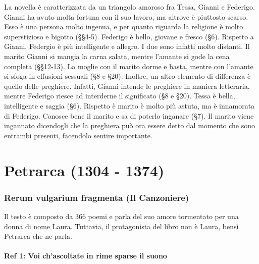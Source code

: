 \documentclass[a4paper]{article}
\begin{document}
La novella è caratterizzata da un triangolo amoroso fra Tessa, Gianni e Federigo.
Gianni ha avuto molta fortuna con il suo lavoro, ma altrove è piuttosto scarso.
Esso è una persona molto ingenua, e per quanto riguarda la religione è molto
superstizioso e bigotto (§§4-5).
Federigo è bello, giovane e fresco (§6).
Rispetto a Gianni, Federgio è più intelligente e allegro.
I due sono infatti molto distanti.
Il marito Gianni si mangia la carna salata, mentre l'amante si gode la cena completa (§§12-13).
La moglie con il marito dorme e basta, mentre con l'amante si sfoga in effusioni sessuali (§8 e §20).
Inoltre, un altro elemento di differenza è quello delle preghiere. Infatti, Gianni intende le preghiere in maniera letteraria,
mentre Federigo riesce ad interderne il significato (§8 e §20).
%
Tessa è bella, intelligente e saggia (§6). Rispetto è marito è molto più astuta, ma è innamorata di Federigo.
Conosce bene il marito e sa di poterlo inganare (§7).
Il marito viene ingannato dicendogli che la preghiera può ora essere detto dal momento che sono
entrambi presenti, facendolo sentire importante.



\pagebreak

\part{Petrarca (1304 - 1374)}



\section{Rerum vulgarium fragmenta (Il Canzoniere)}

Il testo è composto da 366 poemi e parla del suo amore tormentato per una donna di nome Laura.
Tuttavia, il protagonista del libro non è Laura, bensì Petrarca che ne parla.

\subsection{Ref 1: Voi ch'ascoltate in rime sparse il suono}
\end{document}
